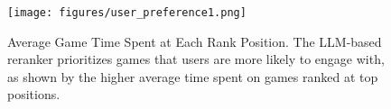 \begin{figure}[t]
\begin{center}
\centerline{\texttt{[image: figures/user\_preference1.png]}}

\caption{Average Game Time Spent at Each Rank Position. The LLM-based reranker prioritizes games that users are more likely to engage with, as shown by the higher average time spent on games ranked at top positions.}
\label{fig:user_preference}
\end{center}
\vskip -0.1in
\end{figure}